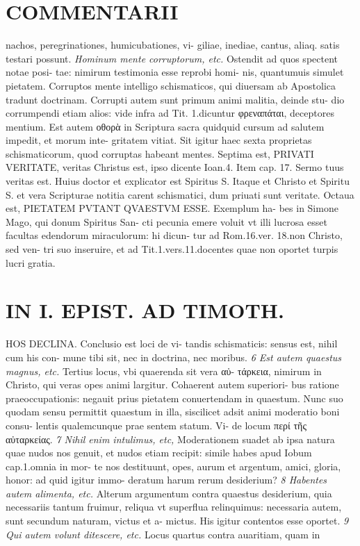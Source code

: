 \documentclass{article}
\begin{document}
\begin{pages}
\section*{COMMENTARII }
\marginpar{[ p.154 ]}\pstart nachos, peregrinationes, humicubationes, vi- giliae, inediae, cantus, aliaq. satis testari possunt.  \pend
\textit{Hominum mente corruptorum, etc. }\pstart Ostendit ad quos spectent notae posi- tae: nimirum testimonia esse reprobi homi- nis, quantumuis simulet pietatem. Corruptos mente intelligo schismaticos, qui diuersam ab Apostolica tradunt doctrinam. Corrupti autem sunt primum animi malitia, deinde stu- dio corrumpendi etiam alios: vide infra ad Tit. 1.dicuntur φρεναπάται, deceptores mentium.  \pend\pstart Est autem οθορὰ in Scriptura sacra quidquid cursum ad salutem impedit, et morum inte- gritatem vitiat. Sit igitur haec sexta proprietas schismaticorum, quod corruptas habeant mentes.  \pend\pstart Septima est, PRIVATI VERITATE, veritas Christus est, ipso dicente Ioan.4. Item cap. 17. Sermo tuus veritas est. Huius doctor et explicator est Spiritus S. Itaque et Christo et Spiritu S. et vera Scripturae notitia carent schismatici, dum priuati sunt veritate.  \pend\pstart Octaua est, PIETATEM PVTANT QVAESTVM ESSE. Exemplum ha- bes in Simone Mago, qui donum Spiritus San- cti pecunia emere voluit vt illi lucrosa esset facultas edendorum miraculorum: hi dicun- tur ad Rom.16.ver. 18.non Christo, sed ven- tri suo inseruire, et ad Tit.1.vers.11.docentes quae non oportet turpis lucri gratia.  \pend
\section*{IN I. EPIST. AD TIMOTH. }
\marginpar{[ p.155 ]}\pstart HOS DECLINA. Conclusio est loci de vi- tandis schismaticis: sensus est, nihil cum his con- mune tibi sit, nec in doctrina, nec moribus.  \pend
\textit{6 Est autem quaestus magnus, etc. }\pstart Tertius locus, vbi quaerenda sit vera αὐ- τάρκεια, nimirum in Christo, qui veras opes animi largitur. Cohaerent autem superiori- bus ratione praeoccupationis: negauit prius pietatem conuertendam in quaestum. Nunc suo quodam sensu permittit quaestum in illa, siscilicet adsit animi moderatio boni consu- lentis qualemcunque prae sentem statum. Vi- de locum περί τῆς αὐταρκείας.  \pend
\textit{7 Nihil enim intulimus, etc, }\pstart Moderationem suadet ab ipsa natura quae nudos nos genuit, et nudos etiam recipit: simile habes apud Iobum cap.1.omnia in mor- te nos destituunt, opes, aurum et argentum, amici, gloria, honor: ad quid igitur immo- deratum harum rerum desiderium?  \pend
\textit{8 Habentes autem alimenta, etc. }\pstart Alterum argumentum contra quaestus desiderium, quia necessariis tantum fruimur, reliqua vt superflua relinquimus: necessaria autem, sunt secundum naturam, victus et a- mictus. His igitur contentos esse oportet.  \pend
\textit{9 Qui autem volunt ditescere, etc. }\pstart Locus quartus contra auaritiam, quam in  \pend

\end{pages}
\end{document}
